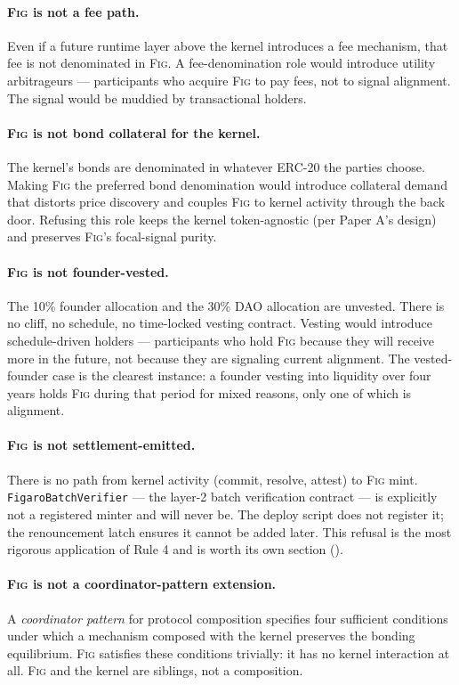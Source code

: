 \documentclass[11pt,a4paper]{article}
\theoremstyle{definition}
\theoremstyle{remark}
\newcommand{\fig}{\textsc{Fig}}
\begin{document}
\paragraph{\fig{} is not a fee path.}
Even if a future runtime layer above the kernel introduces a
fee mechanism, that fee is not denominated in \fig. A
fee-denomination role would introduce utility arbitrageurs ---
participants who acquire \fig{} to pay fees, not to signal
alignment. The signal would be muddied by transactional
holders.

\paragraph{\fig{} is not bond collateral for the kernel.}
The kernel's bonds are denominated in whatever ERC-20 the
parties choose. Making \fig{} the preferred bond denomination
would introduce collateral demand that distorts price discovery
and couples \fig{} to kernel activity through the back door.
Refusing this role keeps the kernel token-agnostic (per Paper
A's design) and preserves \fig{}'s focal-signal purity.

\paragraph{\fig{} is not founder-vested.}
The 10\% founder allocation and the 30\% DAO allocation are
unvested. There is no cliff, no schedule, no time-locked vesting
contract. Vesting would introduce schedule-driven holders ---
participants who hold \fig{} because they will receive more in
the future, not because they are signaling current alignment.
The vested-founder case is the clearest instance: a founder
vesting into liquidity over four years holds \fig{} during that
period for mixed reasons, only one of which is alignment.

\paragraph{\fig{} is not settlement-emitted.}
There is no path from kernel activity (commit, resolve, attest)
to \fig{} mint. \texttt{FigaroBatchVerifier} --- the layer-2
batch verification contract --- is explicitly not a registered
minter and will never be. The deploy script does not register
it; the renouncement latch ensures it cannot be added later.
This refusal is the most rigorous application of Rule 4 and is
worth its own section ().

\paragraph{\fig{} is not a coordinator-pattern extension.}
A \emph{coordinator pattern} for protocol composition specifies
four sufficient conditions under which a mechanism composed with
the kernel preserves the bonding equilibrium. \fig{} satisfies these
conditions trivially: it has no kernel interaction at all.
\fig{} and the kernel are siblings, not a composition.
\end{document}
